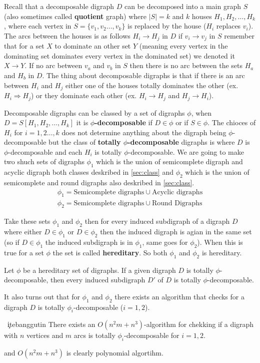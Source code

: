 Recall that a decomposable digraph $D$ can be decomposed into a main graph $S$ (also sometimes called \textbf{quotient} graph) where $|S|=k$ and $k$ houses $H_1,H_2,\dots , H_k$, where each vertex in $S=\lbrace v_1,v_2\dots ,v_k\rbrace$ is replaced by the house ($H_i$ replaces $v_i$).
The arcs between the houses is as follows $H_i \rightarrow H_j$ in $D$ if $v_i\rightarrow v_j$ in $S$ remember that for a set $X$ to dominate an other set $Y$ (meaning every vertex in the dominating set dominates every vertex in the dominated set) we denoted it $X \rightarrow Y$. 
If no arc between $v_a$ and $v_b$ in $S$ then there is no arc between the sets $H_a$ and $H_b$ in $D$. 
The thing about decomposable digraphs is that if there is an arc between $H_i$ and $H_j$ either one of the houses totally dominates the other (ex. $H_i \Rightarrow H_j$) or they dominate each other (ex. $H_i \rightarrow H_j$ and $H_j\rightarrow H_i$).

Decomposable digraphs can be classed by a set of digraphs $\phi$, when \\
$D=S[H_1,H_2,\dots ,H_k]$ it is \textbf{$\phi$-decomposable} if $D\in \phi$ or if $S\in \phi$. The chioces of $H_i$ for $i=1,2\dots , k$ does not determine anything about the digraph being $\phi$-decomposable but the class of \textbf{totally $\phi$-decomposable} digraphs is where $D$ is $\phi$-decomposable and each $H_i$ is totally $\phi$-decomposable. 
We are going to make two shuch sets of digraphs $\phi_1$ which is the union of semicomplete digraph and acyclic digraph both classes deskribed in \autoref{sec:class} and $\phi_2$ which is the union of semicomplete and round digraphs also deskribed in \autoref{sec:class}.  
\begin{align}
    \phi_1=\text{Semicomplete digraphs}\cup \text{Acyclic digraphs}
    \label{eq:phi1}\\
    \phi_2=\text{Semicomplete digraphs}\cup \text{Round Digraphs}
    \label{eq:phi2}
\end{align}

Take these sets $\phi_1$ and $\phi_2$ then for every induced subdigraph of a digraph $D$ where either $D\in \phi_1$ or $D\in \phi_2$ then the induced digraph is agian in the same set (so if $D\in \phi_1$ the induced subdigraph is in $\phi_1$, same goes for $\phi_2$).
When this is true for a set $\phi$ the set is called \textbf{hereditary}. So both $\phi_1$ and $\phi_2$ is hereditary.
\begin{lemma}
    Let $\phi$ be a hereditary set of digraphs. If a given digraph $D$ is totally $\phi$-decomposable, then every induced subdigraph $D'$ of $D$ is totally $\phi$-decomposable.
\end{lemma}
It also turns out that for $\phi_1$ and $\phi_2$ there exists an algorithm that checks for a digraph $D$ is totally $\phi_i$-decomposable ($i=1,2$).
\begin{thm}~\c ite{banggutin}
    There exists an $O(n^2m+n^3)$-algorithm for chekking if a digraph with $n$ vertices and $m$ arcs is totally $\phi_i$-decomposable for $i=1,2$.
    \label{thm:phipoly}
\end{thm}
and $O(n^2m+n^3)$ is clearly polynomial algortihm. 